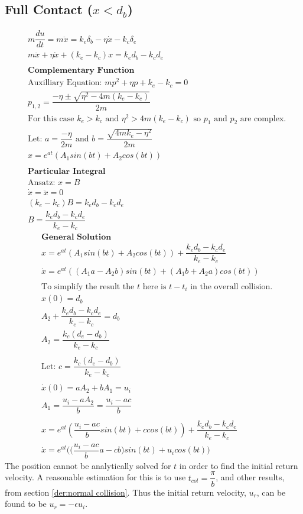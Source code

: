 \documentclass[a4paper,11pt,titlepage]{report}
\begin{document}
\subsection{Full Contact ($x < d_b$)}
\begin{align*}
&m \dfrac{du}{dt} = m \ddot{x} = k_e \delta_b - \eta \dot{x} - k_c \delta_e \\
&m\ddot{x} + \eta \dot{x} + (k_e - k_c) x = k_e d_b - k_c d_e \\\\
&\textbf{Complementary Function} \\
&\text{Auxilliary Equation: } mp^2 + \eta p + k_e - k_c = 0 \\
&p_{1,2} = \dfrac{- \eta \pm \sqrt{\eta^2 - 4m(k_e - k_c)}}{2 m} \\
&\text{For this case $k_e > k_c$ and $\eta ^ 2 > 4 m (k_e - k_c)$ so $p_1$ and $p_2$ are complex.} \\
&\text{Let: } a = \dfrac{-\eta}{2m} \text{ and } b = \dfrac{\sqrt{4mk_e - \eta ^ 2}}{2m} \\
&x = e^{at} (A_1 sin(bt) + A_2 cos (bt)) \\\\
&\textbf{Particular Integral} \\
&\text{Ansatz: } x = B \\
&\dot{x} = \ddot{x} = 0 \\
&(k_e - k_c)B = k_e d_b - k_c d_e \\
& B = \dfrac{k_e d_b - k_c d_e}{k_e - k_c}
\end{align*}
\begin{align*}
&\textbf{General Solution} \\
&x = e^{at} (A_1 sin(bt) + A_2 cos (bt)) + \dfrac{k_e d_b - k_c d_e}{k_e - k_c} \\
&\dot{x} = e^{at}((A_1 a - A_2 b)sin(bt) + (A_1 b + A_2 a) cos(bt)) \\\\
&\text{To simplify the result the $t$ here is $t - t_i$ in the overall collision.} \\
&x(0) = d_b \\
&A_2 + \dfrac{k_e d_b - k_c d_e}{k_e - k_c} = d_b \\
&A_2 = \dfrac{k_c (d_e - d_b)}{k_e - k_c} \\\\
&\text{Let: } c = \dfrac{k_c (d_e - d_b)}{k_e - k_c} \\\\
&\dot{x}(0) = aA_2 + bA_1 = u_i \\
&A_1 = \dfrac{u_i - aA_2}{b} = \dfrac{u_i - ac}{b} \\\\
&x = e^{at} (\dfrac{u_i - ac}{b} sin(bt) + c cos (bt)) + \dfrac{k_e d_b - k_c d_e}{k_e - k_c} \\
&\dot{x} = e^{at}\Big(\Big(\dfrac{u_i - ac}{b} a - c b\Big)sin(bt) + u_i cos(bt)\Big)
\end{align*}
The position cannot be analytically solved for $t$ in order to find the initial return velocity. A reasonable estimation for this is to use $t_{col} = \dfrac{\pi}{b}$, and other results, from section \ref{der:normal collision}. Thus the initial return velocity, $u_r$, can be found to be $u_r = - \epsilon u_i$.
\end{document}
